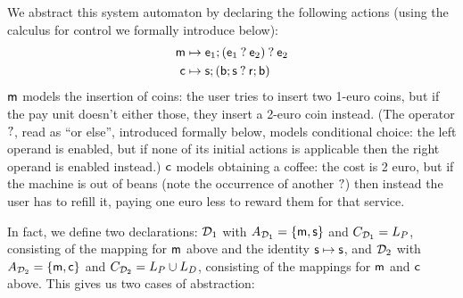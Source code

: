 We abstract this system automaton by declaring the following actions (using the calculus for control we formally introduce below):
%
\begin{align*}
\mathsf{m} & \mapsto \mathsf{e}_1;(\mathsf{e}_1\mathbin{?} \mathsf{e}_2) \mathbin{?} \mathsf{e}_2 \\
\mathsf{c} & \mapsto \mathsf{s};(\mathsf{b};\mathsf{s} \mathbin{?} \mathsf{r};\mathsf{b}) 
\end{align*}
%
$\mathsf{m}$ models the insertion of coins: the user tries to insert two 1-euro coins, but if the pay unit doesn't either those, they insert a 2-euro coin instead. (The operator $\mathbin{?}$, read as ``or else'', introduced formally below, models conditional choice: the left operand is enabled, but if none of its initial actions is applicable then the right operand is enabled instead.) $\mathsf{c}$ models obtaining a coffee: the cost is 2 euro, but if the machine is out of beans (note the occurrence of another $\mathbin{?}$) then instead the user has to refill it, paying one euro less to reward them for that service.

In fact, we define two declarations: $\mathcal{D}_1$ with $A_{\mathcal{D}_1}=\{{\mathsf{m},\mathsf{s}}\}$ and $C_{\mathcal{D}_1}= L_P$, consisting of the mapping for $\mathsf{m}$ above and the identity $\mathsf{s}\mapsto \mathsf{s}$, and $\mathcal{D}_2$ with $A_{\mathcal{D}_2}=\{{\mathsf{m},\mathsf{c}}\}$ and $C_{\mathcal{D}_2}=L_P\cup L_D$, consisting of the mappings for $\mathsf{m}$ and $\mathsf{c}$ above. This gives us two cases of abstraction:

